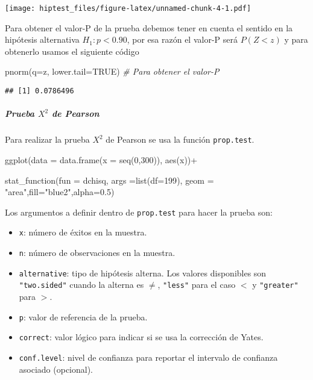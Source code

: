 \documentclass[
]{article}
\newenvironment{Shaded}{}{}
\newcommand{\AttributeTok}[1]{\textcolor[rgb]{0.49,0.56,0.16}{#1}}
\newcommand{\CommentTok}[1]{\textcolor[rgb]{0.38,0.63,0.69}{\textit{#1}}}
\newcommand{\ConstantTok}[1]{\textcolor[rgb]{0.53,0.00,0.00}{#1}}
\newcommand{\DecValTok}[1]{\textcolor[rgb]{0.25,0.63,0.44}{#1}}
\newcommand{\FloatTok}[1]{\textcolor[rgb]{0.25,0.63,0.44}{#1}}
\newcommand{\FunctionTok}[1]{\textcolor[rgb]{0.02,0.16,0.49}{#1}}
\newcommand{\NormalTok}[1]{#1}
\newcommand{\SpecialCharTok}[1]{\textcolor[rgb]{0.25,0.44,0.63}{#1}}
\newcommand{\StringTok}[1]{\textcolor[rgb]{0.25,0.44,0.63}{#1}}
\providecommand{\tightlist}{%
  \setlength{\itemsep}{0pt}\setlength{\parskip}{0pt}}
\begin{document}
\texttt{[image: hiptest\_files/figure-latex/unnamed-chunk-4-1.pdf]}

Para obtener el valor-P de la prueba debemos tener en cuenta el sentido
en la hipótesis alternativa \(H_1: p < 0.90\), por esa razón el valor-P
será \(P(Z<z)\) y para obtenerlo usamos el siguiente código

\begin{Shaded}
\begin{Highlighting}[]
\FunctionTok{pnorm}\NormalTok{(}\AttributeTok{q=}\NormalTok{z, }\AttributeTok{lower.tail=}\ConstantTok{TRUE}\NormalTok{)  }\CommentTok{\# Para obtener el valor{-}P}
\end{Highlighting}
\end{Shaded}

\begin{verbatim}
## [1] 0.0786496
\end{verbatim}

\hypertarget{prueba-x2-de-pearson}{%
\subparagraph{\texorpdfstring{Prueba \(X^2\) de
Pearson}{Prueba X\^{}2 de Pearson}}\label{prueba-x2-de-pearson}}

Para realizar la prueba \(X^2\) de Pearson se usa la función
\texttt{prop.test}.

\begin{Shaded}
\begin{Highlighting}[]
\FunctionTok{ggplot}\NormalTok{(}\AttributeTok{data =} \FunctionTok{data.frame}\NormalTok{(}\AttributeTok{x =} \FunctionTok{seq}\NormalTok{(}\DecValTok{0}\NormalTok{,}\DecValTok{300}\NormalTok{)), }\FunctionTok{aes}\NormalTok{(x))}\SpecialCharTok{+}
 
  \FunctionTok{stat\_function}\NormalTok{(}\AttributeTok{fun =}\NormalTok{ dchisq, }\AttributeTok{args =}\FunctionTok{list}\NormalTok{(}\AttributeTok{df=}\DecValTok{199}\NormalTok{),}
                \AttributeTok{geom =} \StringTok{"area"}\NormalTok{,}\AttributeTok{fill=}\StringTok{"blue2"}\NormalTok{,}\AttributeTok{alpha=}\FloatTok{0.5}\NormalTok{)}
\end{Highlighting}
\end{Shaded}

Los argumentos a definir dentro de \texttt{prop.test} para hacer la
prueba son:

\begin{itemize}
\tightlist
\item
  \texttt{x}: número de éxitos en la muestra.
\item
  \texttt{n}: número de observaciones en la muestra.
\item
  \texttt{alternative}: tipo de hipótesis alterna. Los valores
  disponibles son \texttt{"two.sided"} cuando la alterna es \(\neq\),
  \texttt{"less"} para el caso \(<\) y \texttt{"greater"} para \(>\).
\item
  \texttt{p}: valor de referencia de la prueba.
\item
  \texttt{correct}: valor lógico para indicar si se usa la corrección de
  Yates.
\item
  \texttt{conf.level}: nivel de confianza para reportar el intervalo de
  confianza asociado (opcional).
\end{itemize}
\end{document}
